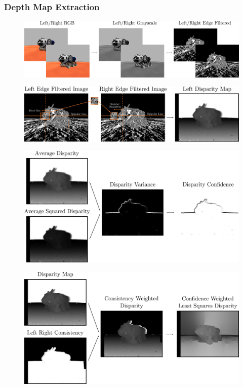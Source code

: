 \subsubsection{Depth Map Extraction}
\begin{figure}[h]
	\centering
	\includegraphics[scale=.28]{chapters/03_background/img/image_preprocessing.png}
	\caption{}
	\label{fig::323_image_preprocessing}
\end{figure}
\begin{figure}[h]
	\centering
	\includegraphics[scale=.28]{chapters/03_background/img/left_disparity_map.png}
	\caption{}
	\label{fig::323_left_disparity_map}
\end{figure}
\begin{figure}[h]
	\centering
	\includegraphics[scale=.28]{chapters/03_background/img/confidence_map.png}
	\caption{}
	\label{fig::323_consistency_map}
\end{figure}
\begin{figure}[h]
	\centering
	\includegraphics[scale=.28]{chapters/03_background/img/weighted_least_squares_disparity.png}
	\caption{}
	\label{fig::323_weighted_least_squares_disparity}
\end{figure}
